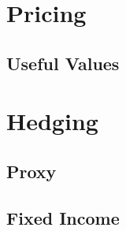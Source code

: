\documentclass[11pt,fleqn]{book} %
\begin{document}
\chapter{Pricing}


\section{Useful Values}




\chapter{Hedging}


\section{Proxy}


\section{Fixed Income}


\cleardoublepage %
\setlength{\columnsep}{0.75cm} %
\printindex %

\end{document}
